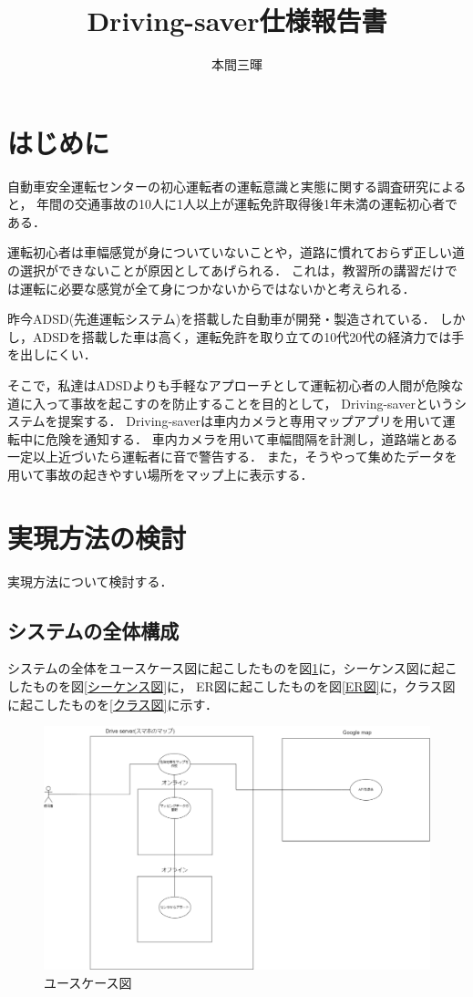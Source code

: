 \documentclass[titlepage,a4paper]{jsarticle}
\title{Driving-saver仕様報告書}
\author{本間三暉}
\begin{document}
\maketitle
\section{はじめに}
自動車安全運転センターの初心運転者の運転意識と実態に関する調査研究\cite{自動車}によると，
年間の交通事故の10人に1人以上が運転免許取得後1年未満の運転初心者である．

運転初心者は車幅感覚が身についていないことや，道路に慣れておらず正しい道の選択ができないことが原因としてあげられる．
これは，教習所の講習だけでは運転に必要な感覚が全て身につかないからではないかと考えられる．

昨今ADSD(先進運転システム)を搭載した自動車が開発・製造されている．
しかし，ADSDを搭載した車は高く，運転免許を取り立ての10代20代の経済力では手を出しにくい．

そこで，私達はADSDよりも手軽なアプローチとして運転初心者の人間が危険な道に入って事故を起こすのを防止することを目的として，
Driving-saverというシステムを提案する．
Driving-saverは車内カメラと専用マップアプリを用いて運転中に危険を通知する．
車内カメラを用いて車幅間隔を計測し，道路端とある一定以上近づいたら運転者に音で警告する．
また，そうやって集めたデータを用いて事故の起きやすい場所をマップ上に表示する．
\section{実現方法の検討}
実現方法について検討する．
\subsection{システムの全体構成}
システムの全体をユースケース図に起こしたものを図\ref{ユースケース図}に，シーケンス図に起こしたものを図\ref{シーケンス図}に，
ER図に起こしたものを図\ref{ER図}に，クラス図に起こしたものを\ref{クラス図}に示す．

\begin{figure}[H]
  \centering
  \includegraphics[width=\textwidth]{img/usecase.drawio.png}
  \caption{ユースケース図}
  \label{ユースケース図}
\end{figure}
\end{document}
